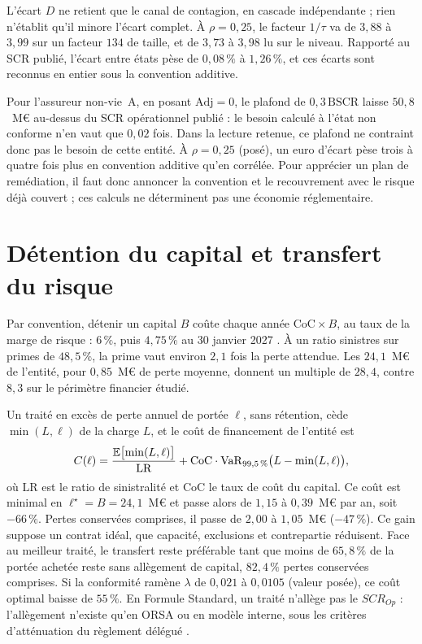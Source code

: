 \vspace{2pt}
\noindent L'écart $D$ ne retient que le canal de contagion, en cascade indépendante ; rien n'établit
qu'il minore l'écart complet. À $\rho = 0{,}25$, le
facteur $1/\tau$ va de $3{,}88$ à $3{,}99$ sur un facteur $134$ de taille, et de $3{,}73$ à $3{,}98$ lu
sur le niveau. Rapporté au SCR publié, l'écart entre états pèse de $0{,}08\,\%$ à $1{,}26\,\%$, et ces
écarts sont reconnus en entier sous la convention additive.

Pour l'assureur non-vie~A, en posant
$\mathrm{Adj}=0$, le plafond de $0{,}3\,\mathrm{BSCR}$ laisse $50{,}8$~M\euro{} au-dessus du SCR
opérationnel publié : le besoin calculé à l'état non conforme n'en vaut que $0{,}02$ fois. Dans la
lecture retenue, ce plafond ne contraint donc pas le besoin de cette entité. À $\rho=0{,}25$ (posé), un euro d'écart pèse trois à quatre fois plus en convention additive
qu'en corrélée. Pour apprécier un plan de remédiation, il faut donc annoncer la convention et le
recouvrement avec le risque déjà couvert ; ces calculs ne déterminent pas une économie réglementaire.

\section{Détention du capital et transfert du risque}
\label{sec:detenir-transferer}

Par convention, détenir un capital $B$ coûte chaque année $\mathrm{CoC}\times B$, au taux de la marge de risque : $6\,\%$, puis $4{,}75\,\%$ au 30 janvier 2027 \citep[directive (UE)~2025/2,][]{eu2025_2}. À un ratio sinistres sur primes de $48{,}5\,\%$, la prime vaut environ $2{,}1$ fois la perte attendue. Les $24{,}1$~M\euro{} de l'entité, pour $0{,}85$~M\euro{} de perte moyenne, donnent un multiple de $28{,}4$, contre $8{,}3$ sur le périmètre financier étudié.

Un traité en excès de perte annuel de portée $\ell$, sans rétention, cède $\min(L,\ell)$ de la charge
$L$, et le coût de financement de l'entité est
\begin{equation}\label{eq:cout-transfert}
C(\ell)=\frac{\mathbb{E}\bigl[\min(L,\ell)\bigr]}{\mathrm{LR}}
+\mathrm{CoC}\cdot\mathrm{VaR}_{99{,}5\,\%}\bigl(L-\min(L,\ell)\bigr),
\end{equation}
où $\mathrm{LR}$ est le ratio de sinistralité et $\mathrm{CoC}$ le taux de coût du capital. Ce coût est
minimal en $\ell^\star=B=24{,}1$~M\euro{} et passe alors de $1{,}15$ à $0{,}39$~M\euro{} par
an, soit $-66\,\%$. Pertes conservées comprises, il passe de $2{,}00$ à $1{,}05$~M\euro{} ($-47\,\%$). Ce gain suppose un contrat idéal, que capacité, exclusions et contrepartie réduisent. Face au meilleur traité, le transfert reste préférable tant que moins de $65{,}8\,\%$ de la portée achetée reste sans allègement de capital, $82{,}4\,\%$ pertes conservées comprises. Si la conformité ramène $\lambda$ de $0{,}021$ à $0{,}0105$ (valeur posée), ce coût optimal baisse de $55\,\%$. En Formule Standard, un traité n'allège pas le $SCR_{Op}$ : l'allègement n'existe qu'en ORSA ou en modèle interne, sous les critères d'atténuation du règlement délégué \citep{eu2015_35}.

